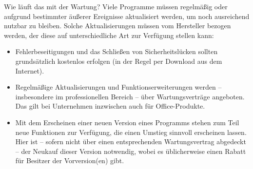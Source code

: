 \documentclass[a6paper,10pt,grid=front%
,toc
]{kartei}
\begin{document}
  \begin{karte}{Wie läuft das mit der Wartung?}  
    Viele Programme müssen regelmäßig oder aufgrund bestimmter äußerer Ereignisse aktualisiert werden, um noch ausreichend nutzbar zu bleiben. Solche Aktualisierungen müssen vom Hersteller bezogen werden, der diese auf unterschiedliche Art zur Verfügung stellen kann:


    \begin{itemize}
      \item Fehlerbeseitigungen und das Schließen von Sicherheitslücken sollten grundsätzlich kostenlos erfolgen (in der Regel per Download aus dem Internet).
      \item Regelmäßige Aktualisierungen und Funktionserweiterungen werden – insbesondere im professionellen Bereich – über Wartungsverträge angeboten. Das gilt bei Unternehmen inzwischen auch für Office-Produkte.
      \item Mit dem Erscheinen einer neuen Version eines Programms stehen zum Teil neue
Funktionen zur Verfügung, die einen Umstieg sinnvoll erscheinen lassen. Hier
ist – sofern nicht über einen entsprechenden Wartungsvertrag abgedeckt – der
Neukauf dieser Version notwendig, wobei es üblicherweise einen Rabatt für
Besitzer der Vorversion(en) gibt.
    \end{itemize}
  \end{karte}

  
\end{document}
